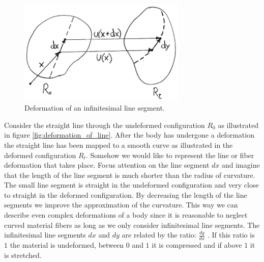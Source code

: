 
\begin{figure}
  \centering
  \includegraphics[width=8cm]{./images/physics_deformation_of_line.png}
\caption{Deformation of an infinitesimal line segment.}
\label{fig:deformation_of_line}
\end{figure}

Consider the straight line through the undeformed configuration $R_0$ as
illustrated in figure \vref{fig:deformation_of_line}. After the body
has undergone a deformation the straight line has been mapped to a
smooth curve as illustrated in the deformed configuration $R_t$. Somehow we
would like to represent the line or fiber deformation that takes
place. Focus attention on the line segment $dx$ and imagine that the
length of the line segment is much shorter than the radius of
curvature. The small line segment is straight in the undeformed
configuration and very close to straight in the deformed
configuration. By decreasing the length of the line segments we
improve the approximation of the curvature. This way we can describe
even complex deformations of a body since it is reasonable to neglect
curved material fibers as long as we only consider infinitesimal line
segments. The infinitesimal line segments $dx$ and $dy$ are related by
the ratio: $\frac{dy}{dx}$
.
If this ratio is $1$ the material is undeformed, between $0$ and
$1$ it is compressed and if above $1$ it is stretched.
%

